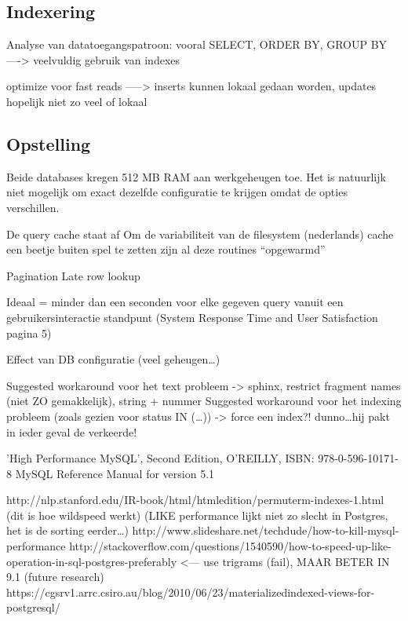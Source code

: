 \subsection{Indexering}
Analyse van datatoegangspatroon: vooral SELECT, ORDER BY, GROUP BY ---->
veelvuldig gebruik van indexes

optimize voor fast reads -----> inserts kunnen lokaal gedaan worden, updates hopelijk niet zo veel of lokaal


\subsection{Opstelling}
Beide databases kregen 512 MB RAM aan werkgeheugen toe. Het is natuurlijk niet mogelijk om exact dezelfde configuratie te krijgen omdat de opties verschillen.

De query cache staat af
Om de variabiliteit van de filesystem (nederlands) cache een beetje buiten spel te zetten zijn al deze routines ``opgewarmd''

Pagination
Late row lookup

Ideaal = minder dan een seconden voor elke gegeven query vanuit een gebruikersinteractie standpunt (System Response Time and User Satisfaction pagina 5)

Effect van DB configuratie (veel geheugen\ldots)

Suggested workaround voor het text probleem -> sphinx, restrict fragment names (niet ZO gemakkelijk), string + nummer
Suggested workaround voor het indexing probleem (zoals gezien voor status IN (\ldots)) -> force een index?! dunno\ldots hij pakt in ieder geval de verkeerde!

'High Performance MySQL', Second Edition, O'REILLY, ISBN: 978-0-596-10171-8
MySQL Reference Manual for version 5.1

http://nlp.stanford.edu/IR-book/html/htmledition/permuterm-indexes-1.html (dit is hoe wildspeed werkt) (LIKE performance lijkt niet zo slecht in Postgres, het is de sorting eerder\ldots)
http://www.slideshare.net/techdude/how-to-kill-mysql-performance
http://stackoverflow.com/questions/1540590/how-to-speed-up-like-operation-in-sql-postgres-preferably <--- use trigrams (fail), MAAR BETER IN 9.1 (future research)
https://cgsrv1.arrc.csiro.au/blog/2010/06/23/materializedindexed-views-for-postgresql/